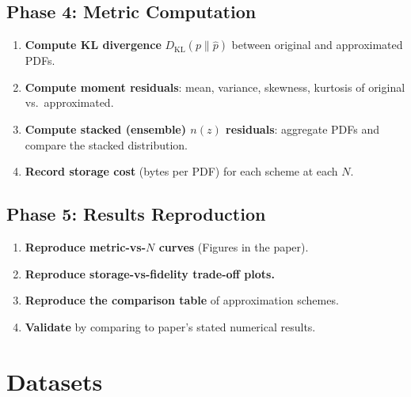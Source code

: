 \documentclass[11pt,a4paper]{article}
\begin{document}
\subsection{Phase 4: Metric Computation}
\begin{enumerate}[label=\textbf{4.\arabic*}]
  \item \textbf{Compute KL divergence} $D_{\mathrm{KL}}(p \| \hat{p})$ between original and approximated PDFs.
  \item \textbf{Compute moment residuals}: mean, variance, skewness, kurtosis of original vs.\ approximated.
  \item \textbf{Compute stacked (ensemble) $n(z)$ residuals}: aggregate PDFs and compare the stacked distribution.
  \item \textbf{Record storage cost} (bytes per PDF) for each scheme at each $N$.
\end{enumerate}

\subsection{Phase 5: Results Reproduction}
\begin{enumerate}[label=\textbf{5.\arabic*}]
  \item \textbf{Reproduce metric-vs-$N$ curves} (Figures in the paper).
  \item \textbf{Reproduce storage-vs-fidelity trade-off plots.}
  \item \textbf{Reproduce the comparison table} of approximation schemes.
  \item \textbf{Validate} by comparing to paper's stated numerical results.
\end{enumerate}

\section{Datasets}
\end{document}
